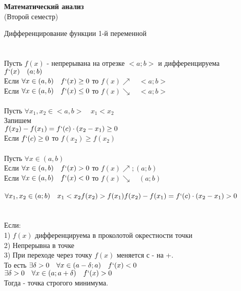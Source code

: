 \begin{center}
	{\bfseries{\huge Математический анализ}} \\
	\LARGE{(Второй семестр)} \\

\end{center}

	\large{Дифференцирование функции 1-й переменной} \\ 

 \\

 \\
Пусть $f(x)$ - непрерывана на отрезке $<a; b>$ и дифференцируема \\
$f`(x) \quad (a;b)$ \\
Если $\forall x \in (a,b) \quad f`(x) \ge 0 $ то $f(x) \nearrow \quad <a; b>$ \\ 
Если $\forall x \in (a,b) \quad f`(x) \le 0 $ то $f(x) \searrow \quad <a; b>$ \\ 

 \\
Пусть $\forall x_{1}, x_{2} \in <a,b> \quad x_{1} < x_{2} $ \\
Запишем  \\
$f(x_{2}) - f(x_{1}) = f`(c) \cdot (x_{2} - x_{1}) \ge 0 $ \\
Если $f`(c) \ge 0$ то $f(x_{2}) \ge f(x_{2})$ \\

 \\
Пусть $\forall x \in (a, b)$ \\
Если $\forall x \in (a, b) \quad f`(x) > 0$ то $f(x) \nearrow; (a; b)$ \\
Если $\forall x \in (a, b) \quad f`(x) < 0$ то $f(x) \searrow \quad (a; b)$ \\

 \\
$\forall x_{1}, x_{2} \in (a; b) \quad x_{1} < x_{2} \\
f(x_{2}) > f(x_{1}) \\
f(x_{2}) - f(x_{1}) = f`(c) \cdot (x_{2} - x_{1}) > 0$ \\

 \\

 \\
Если: \\
	1) $f(x)$ дифференцируема в проколотой окрестности точки \\
	2) Непрерывна в точке  \\
	3) При переходе через точку  $f(x)$ меняется с - на +. \\
	То есть $\exists \delta > 0 \quad \forall x \in (a - \delta; a) \quad f`(x) < 0$ \\
		   $\exists \delta > 0 \quad \forall x \in (a; a + \delta) \quad f`(x) > 0$ \\
Тогда  - точка строгого минимума. \\

